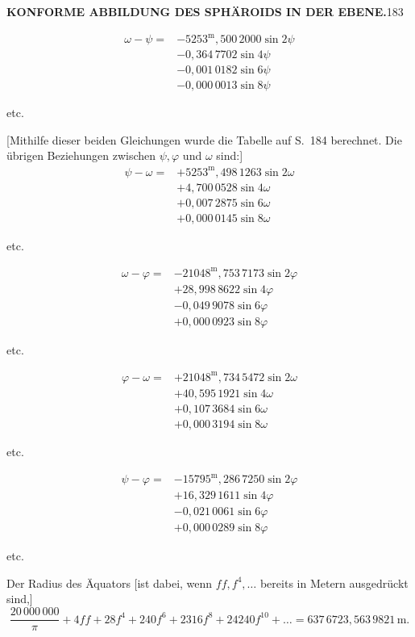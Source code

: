 \par\clearpage
\noindent\null\hfill{\small\textbf{KONFORME ABBILDUNG DES SPHÄROIDS IN DER EBENE.}}\hfill183\par\medskip
\[
\begin{aligned}
\omega-\psi={}&-5253^{\mathrm{m}}{,}500\,2000\sin2\psi\\
&-0{,}364\,7702\sin4\psi\\
&-0{,}001\,0182\sin6\psi\\
&-0{,}000\,0013\sin8\psi
\end{aligned}
\]
{\centering etc.\par}
[Mithilfe dieser beiden Gleichungen wurde die Tabelle auf S.~184 berechnet. Die übrigen Beziehungen zwischen \(\psi,\varphi\) und \(\omega\) sind:]
\[
\begin{aligned}
\psi-\omega={}&+5253^{\mathrm{m}}{,}498\,1263\sin2\omega\\
&+4{,}700\,0528\sin4\omega\\
&+0{,}007\,2875\sin6\omega\\
&+0{,}000\,0145\sin8\omega
\end{aligned}
\]
{\centering etc.\par}
\[
\begin{aligned}
\omega-\varphi={}&-21048^{\mathrm{m}}{,}753\,7173\sin2\varphi\\
&+28{,}998\,8622\sin4\varphi\\
&-0{,}049\,9078\sin6\varphi\\
&+0{,}000\,0923\sin8\varphi
\end{aligned}
\]
{\centering etc.\par}
\[
\begin{aligned}
\varphi-\omega={}&+21048^{\mathrm{m}}{,}734\,5472\sin2\omega\\
&+40{,}595\,1921\sin4\omega\\
&+0{,}107\,3684\sin6\omega\\
&+0{,}000\,3194\sin8\omega
\end{aligned}
\]
{\centering etc.\par}
\[
\begin{aligned}
\psi-\varphi={}&-15795^{\mathrm{m}}{,}286\,7250\sin2\varphi\\
&+16{,}329\,1611\sin4\varphi\\
&-0{,}021\,0061\sin6\varphi\\
&+0{,}000\,0289\sin8\varphi
\end{aligned}
\]
{\centering etc.\par}
Der Radius des Äquators [ist dabei, wenn \(ff,f^4,\ldots\) bereits in Metern ausgedrückt sind,]
\[
\frac{20\,000\,000}{\pi}+4ff+28f^4+240f^6+2316f^8+24240f^{10}+\ldots
=637\,6723{,}563\,9821\,\mathrm{m}.
\]

